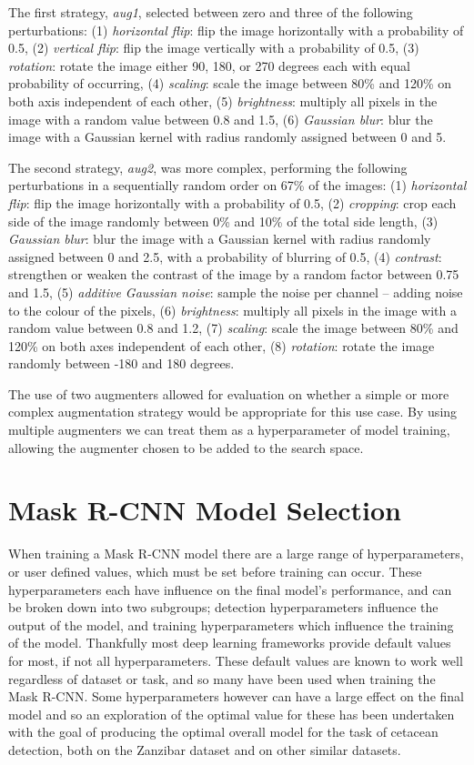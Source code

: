 The first strategy, \textit{aug1}, selected between zero and three of the following perturbations: (1) \textit{horizontal flip}: flip the image horizontally with a probability of 0.5, (2) \textit{vertical flip}: flip the image vertically with a probability of 0.5, (3) \textit{rotation}: rotate the image either 90, 180, or 270 degrees each with equal probability of occurring, (4) \textit{scaling}: scale the image between 80\% and 120\% on both axis independent of each other, (5) \textit{brightness}: multiply all pixels in the image with a random value between 0.8 and 1.5, (6) \textit{Gaussian blur}: blur the image with a Gaussian kernel with radius randomly assigned between 0 and  5. 

The second strategy, \textit{aug2}, was more complex, performing the following perturbations in a sequentially random order on 67\% of the images: (1) \textit{horizontal flip}: flip the image horizontally with a probability of 0.5, (2) \textit{cropping}: crop each side of the image randomly between 0\% and 10\% of the total side length, (3) \textit{Gaussian blur}: blur the image with a Gaussian kernel with radius randomly assigned between 0 and 2.5, with a probability of blurring of 0.5, (4) \textit{contrast}: strengthen or weaken the contrast of the image by a random factor between 0.75 and 1.5, (5) \textit{additive Gaussian noise}: sample the noise per channel -- adding noise to the colour of the pixels, (6) \textit{brightness}: multiply all pixels in the image with a random value between 0.8 and 1.2, (7) \textit{scaling}: scale the image between 80\% and 120\% on both axes independent of each other, (8) \textit{rotation}: rotate the image randomly between -180 and 180 degrees. 

The use of two augmenters allowed for evaluation on whether a simple or more complex augmentation strategy would be appropriate for this use case. By using multiple augmenters we can treat them as a hyperparameter of model training, allowing the augmenter chosen to be added to the search space.

\section{Mask R-CNN Model Selection}\label{ch:cetDet,sec:ModelSelection}

When training a Mask R-CNN model there are a large range of hyperparameters, or user defined values, which must be set before training can occur. These hyperparameters each have influence on the final model's performance, and can be broken down into two subgroups; detection hyperparameters influence the output of the model, and training hyperparameters which influence the training of the model. Thankfully most deep learning frameworks provide default values for most, if not all hyperparameters. These default values are known to work well regardless of dataset or task, and so many have been used when training the Mask R-CNN. Some hyperparameters however can have a large effect on the final model and so an exploration of the optimal value for these has been undertaken with the goal of producing the optimal overall model for the task of cetacean detection, both on the Zanzibar dataset and on other similar datasets. 

